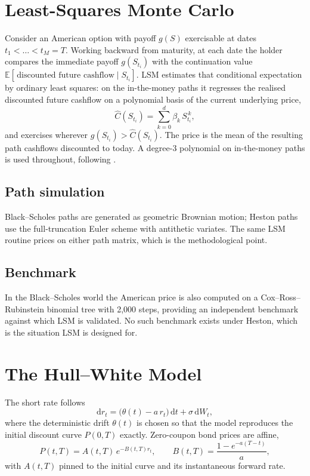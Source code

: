 \documentclass[11pt,a4paper]{report}
\newcommand{\dd}{\mathrm{d}}
\newcommand{\E}{\mathbb{E}}
\begin{document}
\section{Least-Squares Monte Carlo}
Consider an American option with payoff $g(S)$ exercisable at dates
$t_1<\dots<t_M=T$. Working backward from maturity, at each date the holder compares
the immediate payoff $g(S_{t_i})$ with the continuation value
$\E[\,\text{discounted future cashflow}\mid S_{t_i}]$. LSM estimates that
conditional expectation by ordinary least squares: on the in-the-money paths it
regresses the realised discounted future cashflow on a polynomial basis of the
current underlying price,
\begin{equation}
\widehat{C}(S_{t_i}) = \sum_{k=0}^{d} \beta_k\, S_{t_i}^{\,k},
\end{equation}
and exercises wherever $g(S_{t_i}) > \widehat{C}(S_{t_i})$. The price is the mean of
the resulting path cashflows discounted to today. A degree-3 polynomial on
in-the-money paths is used throughout, following \citet{longstaff2001}.

\subsection{Path simulation}
Black--Scholes paths are generated as geometric Brownian motion; Heston paths use the
full-truncation Euler scheme with antithetic variates. The same LSM routine prices on
either path matrix, which is the methodological point.

\subsection{Benchmark}
In the Black--Scholes world the American price is also computed on a
Cox--Ross--Rubinstein binomial tree with 2{,}000 steps, providing an independent
benchmark against which LSM is validated. No such benchmark exists under Heston,
which is the situation LSM is designed for.

\section{The Hull--White Model}
The short rate follows
\begin{equation}
\dd r_t = \big(\theta(t) - a\, r_t\big)\,\dd t + \sigma\, \dd W_t,
\end{equation}
where the deterministic drift $\theta(t)$ is chosen so that the model reproduces the
initial discount curve $P(0,T)$ exactly. Zero-coupon bond prices are affine,
\begin{equation}
P(t,T) = A(t,T)\, e^{-B(t,T) r_t}, \qquad B(t,T) = \frac{1-e^{-a(T-t)}}{a},
\end{equation}
with $A(t,T)$ pinned to the initial curve and its instantaneous forward rate.
\end{document}
